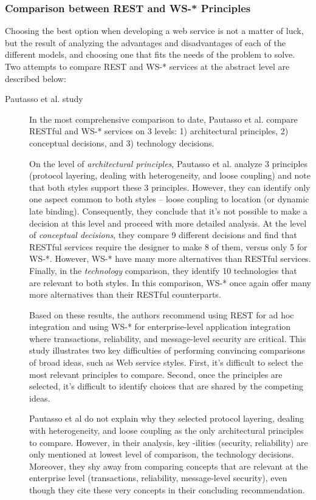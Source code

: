 \subsubsection{Comparison between REST and WS-* Principles}
Choosing the best option when developing a web service is not a matter of luck, but the result of analyzing the advantages and disadvantages of each of the different models, and choosing one that fits the needs of the problem to solve. Two attempts to compare REST and WS-* services at the abstract level are described below:

\begin{description}
\item[Pautasso et al. study] In the most comprehensive comparison to date, Pautasso et al.\cite{Pautasso:2008} compare RESTful and WS-* services on 3 levels: 1) architectural principles, 2) conceptual decisions, and 3) technology decisions.

On the level of \emph{architectural principles}, Pautasso et al. analyze 3 principles (protocol layering, dealing with heterogeneity, and loose coupling) and note that both styles support these 3 principles. However, they can identify only one aspect common to both styles -- loose coupling to location (or dynamic late binding). Consequently, they conclude that it's not possible to make a decision at this level and proceed with more detailed analysis. At the level of \emph{conceptual decisions}, they compare 9 different decisions and find that RESTful services require the designer to make 8 of them, versus only 5 for WS-*. However, WS-* have many more alternatives than RESTful services. Finally, in the \emph{technology} comparison, they identify 10 technologies that are relevant to both styles. In this comparison, WS-* once again offer many more alternatives than their RESTful counterparts.

Based on these results, the authors recommend using REST for ad hoc integration and using WS-* for enterprise-level application integration where transactions, reliability, and message-level security are critical. This study illustrates two key difficulties of performing convincing comparisons of broad ideas, such as Web service styles. First, it's difficult to select the most relevant principles to compare. Second, once the principles are selected, it's difficult to identify choices that are shared by the competing ideas.

Pautasso et al do not explain why they selected protocol layering, dealing with heterogeneity, and loose coupling as the only architectural principles to compare. However, in their analysis, key -ilities (security, reliability) are only mentioned at lowest level of comparison, the technology decisions. Moreover, they shy away from comparing concepts that are relevant at the enterprise level (transactions, reliability, message-level security), even though they cite these very concepts in their concluding recommendation.


\end{description}
